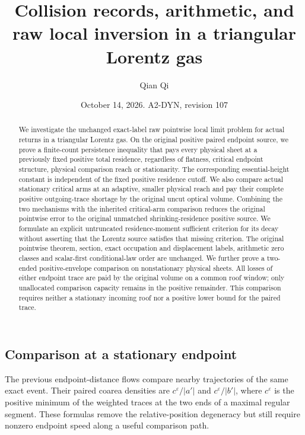 \documentclass[11pt,reqno]{amsart}
\title[Collision records and raw local inversion]{Collision records, arithmetic, and raw local inversion in a triangular Lorentz gas}
\author{Qian Qi}
\date{October 14, 2026. A2-DYN, revision 107}
\numberwithin{equation}{section}
\theoremstyle{definition}\newtheorem{definition}[theorem]{Definition}
\theoremstyle{remark}\newtheorem{remark}[theorem]{Remark}
\begin{document}
\raggedbottom
\begin{abstract}
We investigate the unchanged exact-label raw pointwise local limit
problem for actual returns in a triangular Lorentz gas. On the
original positive paired endpoint source, we prove a finite-count
persistence inequality that pays every physical sheet at a previously
fixed positive total residence, regardless of flatness, critical
endpoint structure, physical comparison reach or stationarity.
The corresponding essential-height constant is independent of the
fixed positive residence cutoff. We also compare actual stationary
critical arms at an adaptive, smaller physical reach and pay their
complete positive outgoing-trace shortage by the original uncut
optical volume. Combining the two mechanisms with the inherited
critical-arm comparison reduces the original pointwise error
to the original unmatched shrinking-residence positive source.
We formulate an explicit untruncated residence-moment sufficient
criterion for its decay without asserting that the Lorentz source
satisfies that missing criterion. The original pointwise theorem,
section, exact occupation and displacement labels, arithmetic
zero classes and scalar-first conditional-law order are unchanged.
We further prove a two-ended positive-envelope comparison on
nonstationary physical sheets. All losses of either endpoint trace
are paid by the original volume on a common roof window; only
unallocated comparison capacity remains in the positive remainder.
This comparison requires neither a stationary incoming roof nor a
positive lower bound for the paired trace.
\end{abstract}
\maketitle


\subsection{Comparison at a stationary endpoint}
The previous endpoint-distance flows compare nearby trajectories of
the same exact event. Their paired coarea densities are
$c^\varepsilon/|a'|$ and $c^\varepsilon/|b'|$, where
$c^\varepsilon$ is the positive minimum of the weighted traces at
the two ends of a maximal regular segment. These formulas remove
the relative-position degeneracy but still require nonzero endpoint
speed along a useful comparison path.
\end{document}
